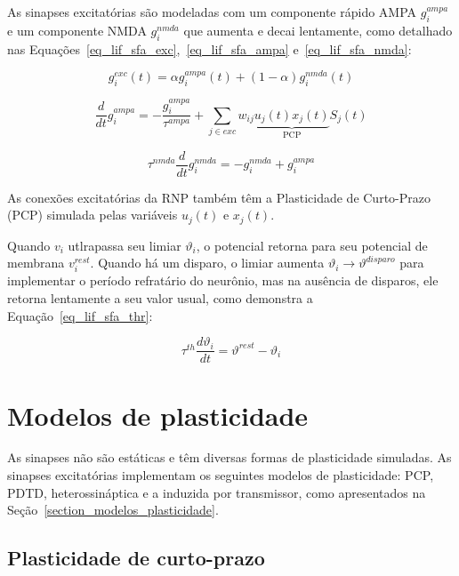 As sinapses excitatórias são modeladas com um componente rápido AMPA $g_i^{ampa}$ e um componente NMDA $g_i^{nmda}$ que aumenta e
decai lentamente, como detalhado nas Equações~\ref{eq_lif_sfa_exc},~\ref{eq_lif_sfa_ampa} e~\ref{eq_lif_sfa_nmda}:

\begin{equation}
\label{eq_lif_sfa_exc}
g_i^{exc}(t) = \alpha g_i^{ampa}(t) + (1-\alpha)g_i^{nmda}(t)
\end{equation}

\begin{equation}
\label{eq_lif_sfa_ampa}
\frac{d}{dt}g_i^{ampa} = -\frac{g_i^{ampa}}{\tau^{ampa}} + \sum_{j\in exc}{w_{ij} 
\underbrace{u_j(t)x_j(t)}_{\text{PCP}}
S_j(t)}
\end{equation}

\begin{equation}
\label{eq_lif_sfa_nmda}
\tau^{nmda} \frac{d}{dt}g_i^{nmda} = -g_i^{nmda} + g_i^{ampa}
\end{equation}

As conexões excitatórias da RNP também têm a Plasticidade de Curto-Prazo (PCP) simulada pelas variáveis $u_j(t)$ e $x_j(t)$.

Quando $v_i$ utlrapassa seu limiar $\vartheta_i$, o potencial retorna para seu potencial de membrana $v_i^{rest}$. Quando há um
disparo, o limiar aumenta $\vartheta_i \rightarrow \vartheta^{disparo}$ para implementar o período refratário do neurônio, mas na
ausência de disparos, ele retorna lentamente a seu valor usual, como demonstra a Equação~\ref{eq_lif_sfa_thr}:

\begin{equation}
\label{eq_lif_sfa_thr}
\tau^{th}\frac{d\vartheta_i}{dt} = \vartheta^{rest} - \vartheta_i
\end{equation}


\section{Modelos de plasticidade}

As sinapses não são estáticas e têm diversas formas de plasticidade simuladas. As sinapses excitatórias implementam os seguintes
modelos de plasticidade: PCP, PDTD, heterossináptica e a induzida por transmissor, como apresentados na
Seção~\ref{section_modelos_plasticidade}.


\subsection{Plasticidade de curto-prazo}

